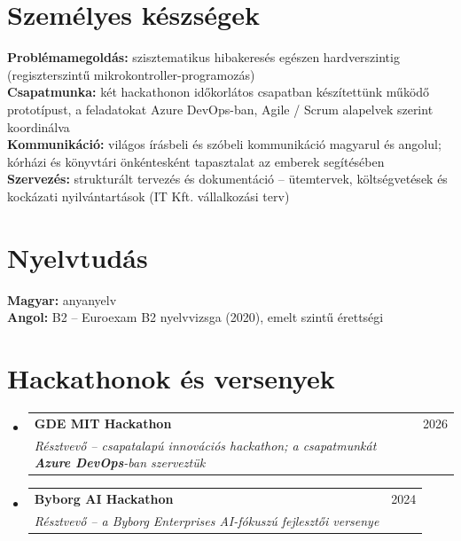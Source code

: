 \documentclass[a4paper,11pt]{article}
\makeatletter
\newcommand{\resumeSubheading}[4]{
  \vspace{-2pt}\item
    \begin{tabular*}{0.97\textwidth}[t]{l@{\extracolsep{\fill}}r}
      \textbf{#1} & #2 \\
      \textit{\small #3} & \textit{\small #4} \\
    \end{tabular*}\vspace{-7pt}
}
\newcommand{\resumeSubHeadingListStart}{\begin{itemize}[leftmargin=0.15in, label={}]}
\newcommand{\resumeSubHeadingListEnd}{\end{itemize}}
\makeatother
\begin{document}
\section{Személyes készségek}
 \begin{itemize}[leftmargin=0.15in, label={}]
    \small{\item{
     \textbf{Problémamegoldás:} szisztematikus hibakeresés egészen hardverszintig (regiszterszintű mikrokontroller-programozás) \\
     \textbf{Csapatmunka:} két hackathonon időkorlátos csapatban készítettünk működő prototípust, a feladatokat Azure DevOps-ban,
       Agile / Scrum alapelvek szerint koordinálva \\
     \textbf{Kommunikáció:} világos írásbeli és szóbeli kommunikáció magyarul és angolul; kórházi és könyvtári önkéntesként
       tapasztalat az emberek segítésében \\
     \textbf{Szervezés:} strukturált tervezés és dokumentáció -- ütemtervek, költségvetések és kockázati nyilvántartások
       (IT Kft. vállalkozási terv)
    }}
 \end{itemize}

\section{Nyelvtudás}
 \begin{itemize}[leftmargin=0.15in, label={}]
    \small{\item{
     \textbf{Magyar:} anyanyelv \\
     \textbf{Angol:} B2 -- Euroexam B2 nyelvvizsga (2020), emelt szintű érettségi
    }}
 \end{itemize}

\section{Hackathonok és versenyek}
  \resumeSubHeadingListStart
    \resumeSubheading
      {GDE MIT Hackathon}{2026}
      {Résztvevő -- csapatalapú innovációs hackathon; a csapatmunkát \textbf{Azure DevOps}-ban szerveztük}{}
    \resumeSubheading
      {Byborg AI Hackathon}{2024}
      {Résztvevő -- a Byborg Enterprises AI-fókuszú fejlesztői versenye}{}
  \resumeSubHeadingListEnd
\end{document}
